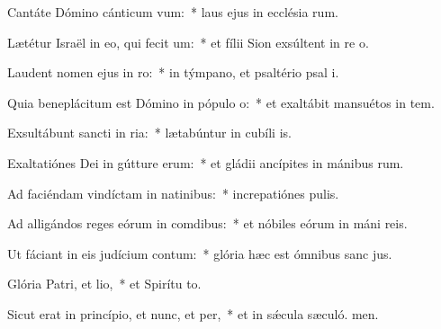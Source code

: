 \item Cantáte Dómino cánticum vum:~* laus ejus in ecclésia rum.
\item Lætétur Israël in eo, qui fecit um:~* et fílii Sion exsúltent in re o.
\item Laudent nomen ejus in ro:~* in týmpano, et psaltério psal i.
\item Quia beneplácitum est Dómino in pópulo o:~* et exaltábit mansuétos in tem.
\item Exsultábunt sancti in ria:~* lætabúntur in cubíli is.
\item Exaltatiónes Dei in gútture erum:~* et gládii ancípites in mánibus rum.
\item Ad faciéndam vindíctam in natinibus:~* increpatiónes  pulis.
\item Ad alligándos reges eórum in comdibus:~* et nóbiles eórum in máni reis.
\item Ut fáciant in eis judícium contum:~* glória hæc est ómnibus sanc jus.
\item Glória Patri, et lio,~* et Spirítu to.
\item Sicut erat in princípio, et nunc, et per,~* et in sǽcula sæculó. men.

